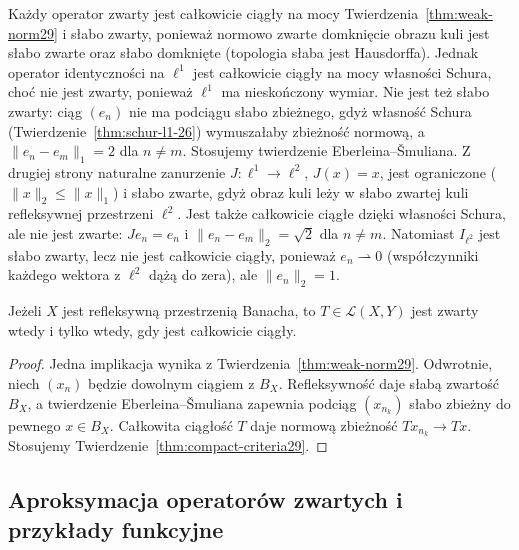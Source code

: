 \begin{przyklad}
\label{ex:weak-vs-compact29}
Każdy operator zwarty jest całkowicie ciągły na mocy
Twierdzenia~\ref{thm:weak-norm29} i słabo zwarty, ponieważ
normowo zwarte domknięcie obrazu kuli jest słabo zwarte
oraz słabo domknięte (topologia słaba jest Hausdorffa).
Jednak operator identyczności na $\ell^1$ jest całkowicie
ciągły na mocy własności Schura, choć nie jest zwarty,
ponieważ $\ell^1$ ma nieskończony wymiar. Nie jest też
słabo zwarty: ciąg $(e_n)$ nie ma podciągu słabo zbieżnego,
gdyż własność Schura (Twierdzenie~\ref{thm:schur-l1-26})
wymuszałaby zbieżność normową, a $\|e_n-e_m\|_1=2$
dla $n\ne m$. Stosujemy twierdzenie Eberleina--\v Smuliana.
Z drugiej strony naturalne zanurzenie
$J:\ell^1\to\ell^2$, $J(x)=x$, jest ograniczone
($\|x\|_2\le\|x\|_1$) i słabo zwarte, gdyż obraz kuli
leży w słabo zwartej kuli refleksywnej przestrzeni $\ell^2$.
Jest także całkowicie ciągłe dzięki własności Schura,
ale nie jest zwarte: $Je_n=e_n$ i $\|e_n-e_m\|_2=\sqrt2$
dla $n\ne m$. Natomiast $I_{\ell^2}$ jest słabo zwarty,
lecz nie jest całkowicie ciągły, ponieważ $e_n\rightharpoonup0$
(współczynniki każdego wektora z $\ell^2$ dążą do zera),
ale $\|e_n\|_2=1$.
\end{przyklad}

\begin{twierdzenie}
\label{thm:reflexive-complete-cont29}
Jeżeli $X$ jest refleksywną przestrzenią Banacha, to
$T\in\mathcal L(X,Y)$ jest zwarty wtedy i tylko wtedy,
gdy jest całkowicie ciągły.
\end{twierdzenie}
\begin{proof}
Jedna implikacja wynika z
Twierdzenia~\ref{thm:weak-norm29}. Odwrotnie,
niech $(x_n)$ będzie dowolnym ciągiem z $B_X$.
Refleksywność daje słabą zwartość $B_X$, a twierdzenie
Eberleina--\v Smuliana zapewnia podciąg $(x_{n_k})$
słabo zbieżny do pewnego $x\in B_X$.
Całkowita ciągłość $T$ daje normową zbieżność
$Tx_{n_k}\to Tx$. Stosujemy
Twierdzenie~\ref{thm:compact-criteria29}.
\end{proof}

\subsection{Aproksymacja operatorów zwartych i przykłady funkcyjne}

